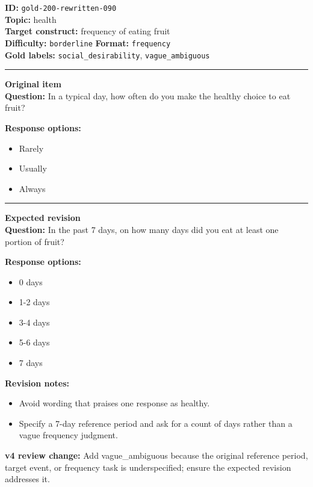 \documentclass[10pt,a4paper]{article}
\newcommand{\sectionline}{\vspace{0.15em}\hrule\vspace{0.35em}}
\begin{document}
\begin{tcolorbox}[colframe=FlawRed,colback=white,colbacktitle=FlawRed!9,coltitle=black,title={Item 090\hfill Flawed item}]
\textbf{ID:} \texttt{gold-200-rewritten-090}\\
\textbf{Topic:} health\\
\textbf{Target construct:} frequency of eating fruit\\
\textbf{Difficulty:} \texttt{borderline} \quad \textbf{Format:} \texttt{frequency}\\
\textbf{Gold labels:} \texttt{social\_desirability}, \texttt{vague\_ambiguous}\\
\sectionline
\textbf{Original item}\\
\textbf{Question:} In a typical day, how often do you make the healthy choice to eat fruit?
\par\textbf{Response options:}
\begin{itemize}
\item Rarely
\item Usually
\item Always
\end{itemize}
\sectionline
\textbf{Expected revision}\\
\textbf{Question:} In the past 7 days, on how many days did you eat at least one portion of fruit?
\par\textbf{Response options:}
\begin{itemize}
\item 0 days
\item 1-2 days
\item 3-4 days
\item 5-6 days
\item 7 days
\end{itemize}
\par\textbf{Revision notes:}
\begin{itemize}
\item Avoid wording that praises one response as healthy.
\item Specify a 7-day reference period and ask for a count of days rather than a vague frequency judgment.
\end{itemize}
\par\textbf{v4 review change:} Add vague\_ambiguous because the original reference period, target event, or frequency task is underspecified; ensure the expected revision addresses it.
\end{tcolorbox}
\end{document}

